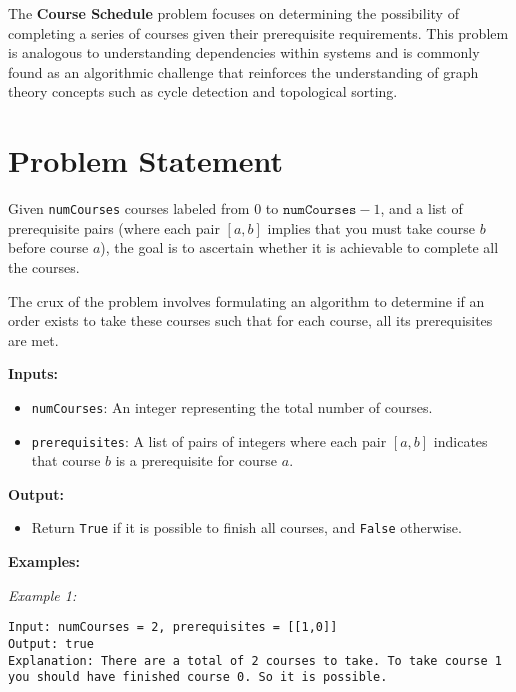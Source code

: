
\label{problem:course_schedule}
    
The \textbf{Course Schedule} problem focuses on determining the possibility of completing a series of courses given their prerequisite requirements. This problem is analogous to understanding dependencies within systems and is commonly found as an algorithmic challenge that reinforces the understanding of graph theory concepts such as cycle detection and topological sorting.

\section*{Problem Statement}

Given \texttt{numCourses} courses labeled from \(0\) to \(\texttt{numCourses} - 1\), and a list of prerequisite pairs (where each pair \([a, b]\) implies that you must take course \(b\) before course \(a\)), the goal is to ascertain whether it is achievable to complete all the courses.

The crux of the problem involves formulating an algorithm to determine if an order exists to take these courses such that for each course, all its prerequisites are met.

\textbf{Inputs:}
\begin{itemize}
    \item \texttt{numCourses}: An integer representing the total number of courses.
    \item \texttt{prerequisites}: A list of pairs of integers where each pair \([a, b]\) indicates that course \(b\) is a prerequisite for course \(a\).
\end{itemize}

\textbf{Output:}
\begin{itemize}
    \item Return \texttt{True} if it is possible to finish all courses, and \texttt{False} otherwise.
\end{itemize}

\textbf{Examples:}

\textit{Example 1:}
\begin{verbatim}
Input: numCourses = 2, prerequisites = [[1,0]]
Output: true
Explanation: There are a total of 2 courses to take. To take course 1 you should have finished course 0. So it is possible.
\end{verbatim}

